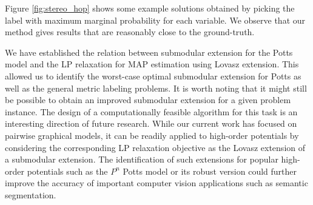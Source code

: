 Figure \ref{fig:stereo_hop} shows some example solutions obtained by picking the
label with maximum marginal probability for each variable. We observe that our method gives results that are reasonably close to the ground-truth. 

\label{sec:conclude}
We have established the relation between submodular extension for the Potts
model and the LP relaxation for MAP estimation using Lovasz extension. This allowed us to identify the worst-case optimal submodular extension for Potts as well as the general metric labeling problems. It is worth noting that it might still be possible to obtain an improved submodular extension for a given problem instance. The design of a computationally feasible algorithm for this task is an interesting direction of future research. While our current work has focused on pairwise graphical models, it can be readily applied to high-order potentials by considering the corresponding LP relaxation objective as the Lovasz extension of a submodular extension. The identification of such extensions for popular high-order potentials such as the $P^n$ Potts model or its robust version could further improve the accuracy of important computer vision applications such as semantic segmentation.

\newpage

